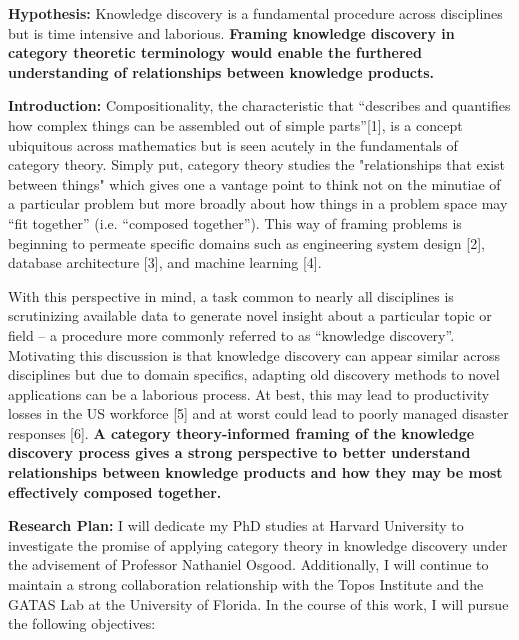 \documentclass[11pt]{extarticle}
\begin{document}
\textbf{Hypothesis:} Knowledge discovery is a fundamental procedure across disciplines but is time intensive and laborious.
\textbf{Framing knowledge discovery in category theoretic terminology would enable the furthered understanding of relationships between knowledge products.}

\textbf{Introduction:} Compositionality, the characteristic that ``describes and quantifies how complex things can be assembled out of simple parts''[1], is a concept ubiquitous across mathematics but is seen acutely in the fundamentals of category theory.
Simply put, category theory studies the "relationships that exist between things" which gives one a vantage point to think not on the minutiae of a particular problem but more broadly about how things in a problem space may ``fit together'' (i.e. ``composed together'').
This way of framing problems is beginning to permeate specific domains such as engineering system design [2], database architecture [3], and machine learning [4]. 

With this perspective in mind, a task common to nearly all disciplines is scrutinizing available data to generate novel insight about a particular topic or field -- a procedure more commonly referred to as ``knowledge discovery''.
Motivating this discussion is that knowledge discovery can appear similar across disciplines but due to domain specifics, adapting old discovery methods to novel applications can be a laborious process. 
At best, this may lead to productivity losses in the US workforce [5] and at worst could lead to poorly managed disaster responses [6].
\textbf{A category theory-informed framing of the knowledge discovery process gives a strong perspective to better understand relationships between knowledge products and how they may be most effectively composed together.}

\textbf{Research Plan:} I will dedicate my PhD studies at Harvard University to investigate the promise of applying category theory in knowledge discovery under the advisement of Professor Nathaniel Osgood.
Additionally, I will continue to maintain a strong collaboration relationship with the Topos Institute and the GATAS Lab at the University of Florida.
In the course of this work, I will pursue the following objectives:
\end{document}

